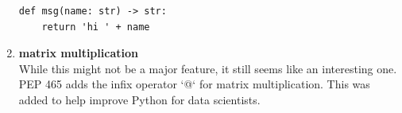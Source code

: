 \documentclass[9pt]{extarticle} %
\begin{document}
\begin{minipage}[t]{.30\linewidth}
\begin{mdframed}[style=sidebar,frametitle={}]
\begin{enumerate}[leftmargin=0cm,itemindent=.5cm]
\begin{lstlisting}
def msg(name: str) -> str:
    return 'hi ' + name
\end{lstlisting}

\item \textbf{matrix multiplication} \\
While this might not be a major feature, it still seems like an interesting
one. PEP 465 adds the infix operator `@` for matrix multiplication. 
This was added to help improve Python for data scientists. 
\end{enumerate}





\end{mdframed}
\end{minipage}\hfill %
%
%
\end{document}
